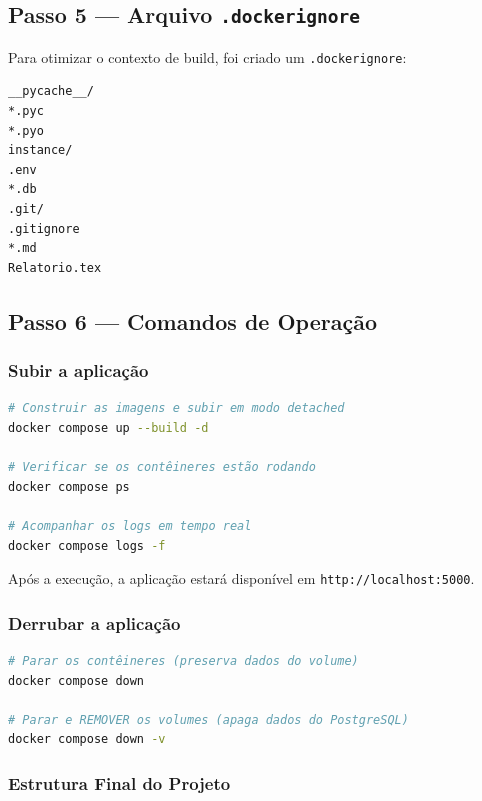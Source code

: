 \documentclass[12pt,a4paper]{article}
\begin{document}
\subsection{Passo 5 — Arquivo \texttt{.dockerignore}}

Para otimizar o contexto de build, foi criado um \texttt{.dockerignore}:

\begin{lstlisting}[caption={\texttt{.dockerignore} — arquivos excluídos do build.}]
__pycache__/
*.pyc
*.pyo
instance/
.env
*.db
.git/
.gitignore
*.md
Relatorio.tex
\end{lstlisting}

\subsection{Passo 6 — Comandos de Operação}

\subsubsection{Subir a aplicação}

\begin{lstlisting}[language=bash, caption={Comandos para construir e iniciar os contêineres.}]
# Construir as imagens e subir em modo detached
docker compose up --build -d

# Verificar se os contêineres estão rodando
docker compose ps

# Acompanhar os logs em tempo real
docker compose logs -f
\end{lstlisting}

Após a execução, a aplicação estará disponível em \texttt{http://localhost:5000}.

\subsubsection{Derrubar a aplicação}

\begin{lstlisting}[language=bash, caption={Comandos para parar e remover os contêineres.}]
# Parar os contêineres (preserva dados do volume)
docker compose down

# Parar e REMOVER os volumes (apaga dados do PostgreSQL)
docker compose down -v
\end{lstlisting}

\subsubsection{Estrutura Final do Projeto}
\end{document}

